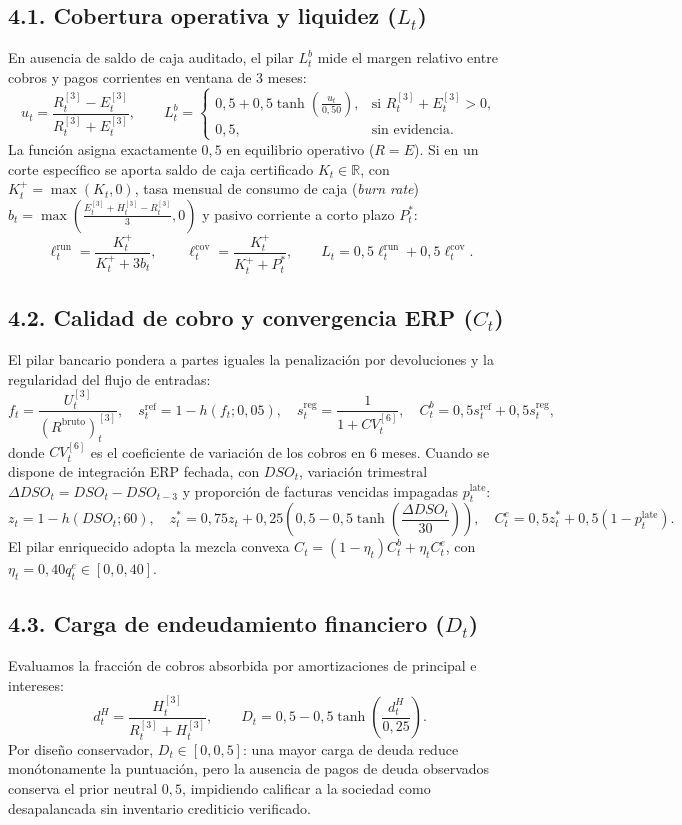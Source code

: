 \documentclass[10pt,a4paper]{article}
\begin{document}
\subsection*{4.1. Cobertura operativa y liquidez ($L_t$)}
En ausencia de saldo de caja auditado, el pilar $L_t^b$ mide el margen relativo entre cobros y pagos corrientes en ventana de 3 meses:
\[
u_t = \frac{R_t^{[3]} - E_t^{[3]}}{R_t^{[3]} + E_t^{[3]}}, \qquad L_t^b = \begin{cases} 0{,}5 + 0{,}5 \tanh\left(\frac{u_t}{0{,}50}\right), & \text{si } R_t^{[3]} + E_t^{[3]} > 0, \\ 0{,}5, & \text{sin evidencia.} \end{cases}
\]
La función asigna exactamente $0{,}5$ en equilibrio operativo ($R = E$). Si en un corte específico se aporta saldo de caja certificado $K_t \in \mathbb{R}$, con $K_t^+ = \max(K_t, 0)$, tasa mensual de consumo de caja (\emph{burn rate}) $b_t = \max\left(\frac{E_t^{[3]} + H_t^{[3]} - R_t^{[3]}}{3}, 0\right)$ y pasivo corriente a corto plazo $P_t^*$:
\[
\ell_t^{\mathrm{run}} = \frac{K_t^+}{K_t^+ + 3b_t}, \qquad \ell_t^{\mathrm{cov}} = \frac{K_t^+}{K_t^+ + P_t^*}, \qquad L_t = 0{,}5 \ell_t^{\mathrm{run}} + 0{,}5 \ell_t^{\mathrm{cov}}.
\]

\subsection*{4.2. Calidad de cobro y convergencia ERP ($C_t$)}
El pilar bancario pondera a partes iguales la penalización por devoluciones y la regularidad del flujo de entradas:
\[
f_t = \frac{U_t^{[3]}}{(R^{\mathrm{bruto}})_t^{[3]}}, \quad s_t^{\mathrm{ref}} = 1 - h(f_t; 0{,}05), \quad s_t^{\mathrm{reg}} = \frac{1}{1 + CV_t^{[6]}}, \quad C_t^b = 0{,}5 s_t^{\mathrm{ref}} + 0{,}5 s_t^{\mathrm{reg}},
\]
donde $CV_t^{[6]}$ es el coeficiente de variación de los cobros en 6 meses. Cuando se dispone de integración ERP fechada, con $DSO_t$, variación trimestral $\Delta DSO_t = DSO_t - DSO_{t-3}$ y proporción de facturas vencidas impagadas $p_t^{\mathrm{late}}$:
\[
z_t = 1 - h(DSO_t; 60), \quad z_t^* = 0{,}75 z_t + 0{,}25 \left(0{,}5 - 0{,}5 \tanh\left(\frac{\Delta DSO_t}{30}\right)\right), \quad C_t^e = 0{,}5 z_t^* + 0{,}5(1 - p_t^{\mathrm{late}}).
\]
El pilar enriquecido adopta la mezcla convexa $C_t = (1 - \eta_t) C_t^b + \eta_t C_t^e$, con $\eta_t = 0{,}40 q_t^e \in [0, 0{,}40]$.

\subsection*{4.3. Carga de endeudamiento financiero ($D_t$)}
Evaluamos la fracción de cobros absorbida por amortizaciones de principal e intereses:
\[
d_t^H = \frac{H_t^{[3]}}{R_t^{[3]} + H_t^{[3]}}, \qquad D_t = 0{,}5 - 0{,}5 \tanh\left(\frac{d_t^H}{0{,}25}\right).
\]
Por diseño conservador, $D_t \in [0, 0{,}5]$: una mayor carga de deuda reduce monótonamente la puntuación, pero la ausencia de pagos de deuda observados conserva el prior neutral $0{,}5$, impidiendo calificar a la sociedad como desapalancada sin inventario crediticio verificado.
\end{document}
